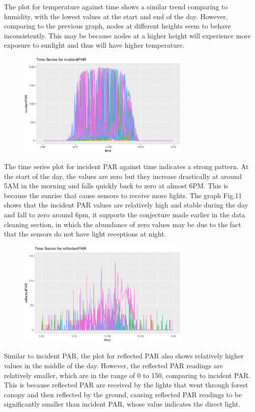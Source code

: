 \documentclass[twocolumn,11pt]{asme2ej}
\begin{document}
The plot for temperature against time shows a similar trend comparing to humidity, with the lowest values at the start and end of the day. However, comparing to the previous graph, nodes at different heights seem to behave inconsistently. This may be because nodes at a higher height will experience more exposure to sunlight and thus will have higher temperature. 

\begin{figure}
    \centering
    \includegraphics[width=85mm]{3c3.png} 
    \caption{}
    \label{fig:3c3}
\end{figure}


The time series plot for incident PAR against time indicates a strong pattern. At the start of the day, the values are zero but they increase drastically at around 5AM in the morning and falls quickly back to zero at almost 6PM. This is because the sunrise that cause sensors to receive more lights. The graph Fig.11 shows that the incident PAR values are relatively high and stable during the day and fall to zero around 6pm, it supports the conjecture made earlier in the data cleaning section, in which the abundance of zero values may be due to the fact that the sensors do not have light receptions at night. 

\begin{figure}
    \centering
    \includegraphics[width=85mm]{3c4.png} 
    \caption{}
    \label{fig:3c4}
\end{figure}


Similar to incident PAR, the plot for reflected PAR also shows relatively higher values in the middle of the day. However, the reflected PAR readings are relatively smaller, which are in the range of 0 to 150, comparing to incident PAR. This is because reflected PAR are received by the lights that went through forest canopy and then reflected by the ground, causing reflected PAR readings to be significantly smaller than incident PAR, whose value indicates the direct light.
\end{document}
